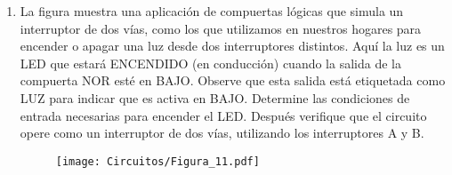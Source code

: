 \documentclass[a4paper, 12pt]{article}
\newcommand{\Aspace}{0.2cm}
\begin{document}
\begin{enumerate}
        \item La figura muestra una aplicación de compuertas lógicas que simula un interruptor de dos vías, como los que utilizamos en nuestros hogares para encender o apagar una luz desde dos interruptores distintos. Aquí la luz es un LED que estará ENCENDIDO (en conducción) cuando la salida de la compuerta NOR esté en BAJO. Observe que esta salida está etiquetada como LUZ para indicar que es activa en BAJO. Determine las condiciones de entrada necesarias para encender el LED. Después verifique que el circuito opere como un interruptor de dos vías, utilizando los interruptores A y B.
        \begin{figure}[!ht]
            \centering
            \texttt{[image: Circuitos/Figura\_11.pdf]}
        \end{figure}
            \vspace{\Aspace} \par
            { \color{azul}  }



    \end{enumerate}
\end{document}
